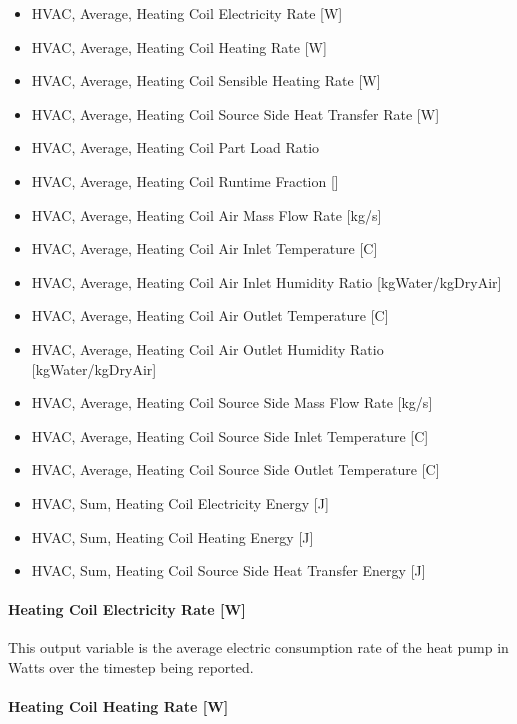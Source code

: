 \begin{itemize}
\item
  HVAC, Average, Heating Coil Electricity Rate {[}W{]}
\item
  HVAC, Average, Heating Coil Heating Rate {[}W{]}
\item
  HVAC, Average, Heating Coil Sensible Heating Rate {[}W{]}
\item
  HVAC, Average, Heating Coil Source Side Heat Transfer Rate {[}W{]}
\item
  HVAC, Average, Heating Coil Part Load Ratio
\item
  HVAC, Average, Heating Coil Runtime Fraction {[]}
\item
  HVAC, Average, Heating Coil Air Mass Flow Rate {[}kg/s{]}
\item
  HVAC, Average, Heating Coil Air Inlet Temperature {[}C{]}
\item
  HVAC, Average, Heating Coil Air Inlet Humidity Ratio {[}kgWater/kgDryAir{]}
\item
  HVAC, Average, Heating Coil Air Outlet Temperature {[}C{]}
\item
  HVAC, Average, Heating Coil Air Outlet Humidity Ratio {[}kgWater/kgDryAir{]}
\item
  HVAC, Average, Heating Coil Source Side Mass Flow Rate {[}kg/s{]}
\item
  HVAC, Average, Heating Coil Source Side Inlet Temperature {[}C{]}
\item
  HVAC, Average, Heating Coil Source Side Outlet Temperature {[}C{]}
\item
  HVAC, Sum, Heating Coil Electricity Energy {[}J{]}
\item
  HVAC, Sum, Heating Coil Heating Energy {[}J{]}
\item
  HVAC, Sum, Heating Coil Source Side Heat Transfer Energy {[}J{]}
\end{itemize}

\paragraph{Heating Coil Electricity Rate {[}W{]}}\label{heating-coil-electric-power-w-7}

This output variable is the average electric consumption rate of the heat pump in Watts over the timestep being reported.

\paragraph{Heating Coil Heating Rate {[}W{]}}\label{heating-coil-heating-rate-w-10}

